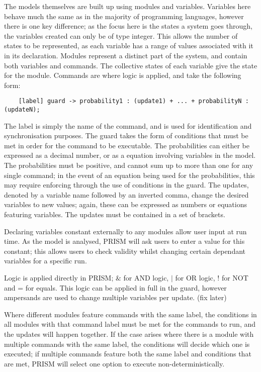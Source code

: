 \documentclass{l4proj}
\begin{document}
The models themselves are built up using modules and variables. Variables here behave much the same as in the majority of programming languages, however there is one key difference; as the focus here is the states a system goes through, the variables created can only be of type integer. This allows the number of states to be represented, as each variable has a range of values associated with it in its declaration. Modules represent a distinct part of the system, and contain both variables and commands. The collective states of each variable give the state for the module. Commands are where logic is applied, and take the following form: 

\begin{lstlisting}
    [label] guard -> probability1 : (update1) + ... + probabilityN : (updateN);
\end{lstlisting}

The label is simply the name of the command, and is used for identification and synchronisation purposes. The guard takes the form of conditions that must be met in order for the command to be executable. The probabilities can either be expressed as a decimal number, or as a equation involving variables in the model. The probabilities must be positive, and cannot sum up to more than one for any single command; in the event of an equation being used for the probabilities, this may require enforcing through the use of conditions in the guard. The updates, denoted by a variable name followed by an inverted comma, change the desired variables to new values; again, these can be expressed as numbers or equations featuring variables. The updates must be contained in a set of brackets.

Declaring variables constant externally to any modules allow user input at run time. As the model is analysed, PRISM will ask users to enter a value for this constant; this allows users to check validity whilst changing certain dependant variables for a specific run.

Logic is applied directly in PRISM; $ \& $ for AND logic, $ \mid $ for OR logic, ! for NOT and = for equals. This logic can be applied in full in the guard, however ampersands are used to change multiple variables per update. (fix later)

Where different modules feature commands with the same label, the conditions in all modules with that command label must be met for the commands to run, and the updates will happen together. If the case arises where there is a module with multiple commands with the same label, the conditions will decide which one is executed; if multiple commands feature both the same label and conditions that are met, PRISM will select one option to execute non-deterministically. 
\end{document}
